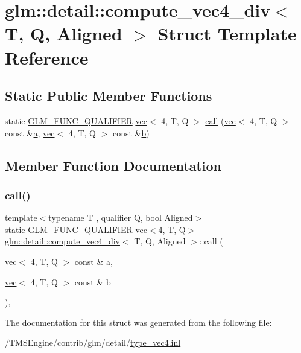 \hypertarget{structglm_1_1detail_1_1compute__vec4__div}{}\section{glm\+:\+:detail\+:\+:compute\+\_\+vec4\+\_\+div$<$ T, Q, Aligned $>$ Struct Template Reference}
\label{structglm_1_1detail_1_1compute__vec4__div}
\subsection*{Static Public Member Functions}
\begin{DoxyCompactItemize}
\item 
static \hyperlink{setup_8hpp_a33fdea6f91c5f834105f7415e2a64407}{G\+L\+M\+\_\+\+F\+U\+N\+C\+\_\+\+Q\+U\+A\+L\+I\+F\+I\+ER} \hyperlink{structglm_1_1vec}{vec}$<$ 4, T, Q $>$ \hyperlink{structglm_1_1detail_1_1compute__vec4__div_aa509cf7a53575bad020952593cf592d3}{call} (\hyperlink{structglm_1_1vec}{vec}$<$ 4, T, Q $>$ const \&\hyperlink{_s_d_l__opengl__glext_8h_a3309789fc188587d666cda5ece79cf82}{a}, \hyperlink{structglm_1_1vec}{vec}$<$ 4, T, Q $>$ const \&\hyperlink{_s_d_l__opengl__glext_8h_a0f71581a41fd2264c8944126dabbd010}{b})
\end{DoxyCompactItemize}


\subsection{Member Function Documentation}
\mbox{\label{structglm_1_1detail_1_1compute__vec4__div_aa509cf7a53575bad020952593cf592d3}} 
\subsubsection{\texorpdfstring{call()}{call()}}
{\footnotesize\ttfamily template$<$typename T , qualifier Q, bool Aligned$>$ \\
static \hyperlink{setup_8hpp_a33fdea6f91c5f834105f7415e2a64407}{G\+L\+M\+\_\+\+F\+U\+N\+C\+\_\+\+Q\+U\+A\+L\+I\+F\+I\+ER} \hyperlink{structglm_1_1vec}{vec}$<$4, T, Q$>$ \hyperlink{structglm_1_1detail_1_1compute__vec4__div}{glm\+::detail\+::compute\+\_\+vec4\+\_\+div}$<$ T, Q, Aligned $>$\+::call (\begin{DoxyParamCaption}\item[{\hyperlink{structglm_1_1vec}{vec}$<$ 4, T, Q $>$ const \&}]{a,  }\item[{\hyperlink{structglm_1_1vec}{vec}$<$ 4, T, Q $>$ const \&}]{b }\end{DoxyParamCaption})\hspace{0.3cm}{\ttfamily [inline]}, {\ttfamily [static]}}



The documentation for this struct was generated from the following file\+:\begin{DoxyCompactItemize}
\item 
/\+T\+M\+S\+Engine/contrib/glm/detail/\hyperlink{type__vec4_8inl}{type\+\_\+vec4.\+inl}\end{DoxyCompactItemize}
